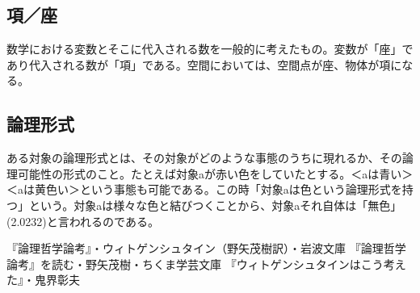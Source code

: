 \documentclass[a4paper,11pt]{jsarticle}
\begin{document}
\subsection{項／座}
数学における変数とそこに代入される数を一般的に考えたもの。変数が「座」であり代入される数が「項」である。空間においては、空間点が座、物体が項になる。

\subsection{論理形式}
ある対象の論理形式とは、その対象がどのような事態のうちに現れるか、その論理可能性の形式のこと。たとえば対象aが赤い色をしていたとする。＜aは青い＞＜aは黄色い＞という事態も可能である。この時「対象aは色という論理形式を持つ」という。対象aは様々な色と結びつくことから、対象aそれ自体は「無色」(2.0232)と言われるのである。

\begin{thebibliography}{9}
	 『論理哲学論考』・ウィトゲンシュタイン（野矢茂樹訳）・岩波文庫
	 『論理哲学論考』を読む・野矢茂樹・ちくま学芸文庫
	 『ウィトゲンシュタインはこう考えた』・鬼界彰夫
\end{thebibliography}
\end{document}

